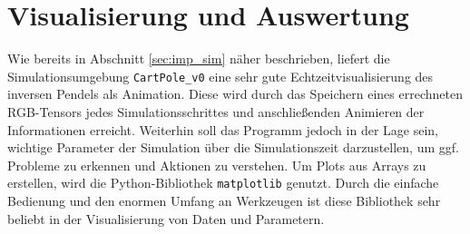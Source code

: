 \section{Visualisierung und Auswertung}
\label{sec:imp_vis}
	Wie bereits in Abschnitt \ref{sec:imp_sim} näher beschrieben, liefert die Simulationsumgebung \texttt{CartPole\_v0} eine sehr gute Echtzeitvisualisierung des inversen Pendels als Animation. Diese wird durch das Speichern eines errechneten RGB-Tensors jedes Simulationsschrittes und anschließenden Animieren der Informationen erreicht. Weiterhin soll das Programm jedoch in der Lage sein, wichtige Parameter der Simulation über die Simulationszeit darzustellen, um ggf. Probleme zu erkennen und Aktionen zu verstehen. Um Plots aus Arrays zu erstellen, wird die Python-Bibliothek \texttt{matplotlib} \cite{Hunter2007} genutzt. Durch die einfache Bedienung und den enormen Umfang an Werkzeugen ist diese Bibliothek sehr beliebt in der Visualisierung von Daten und Parametern.
	
